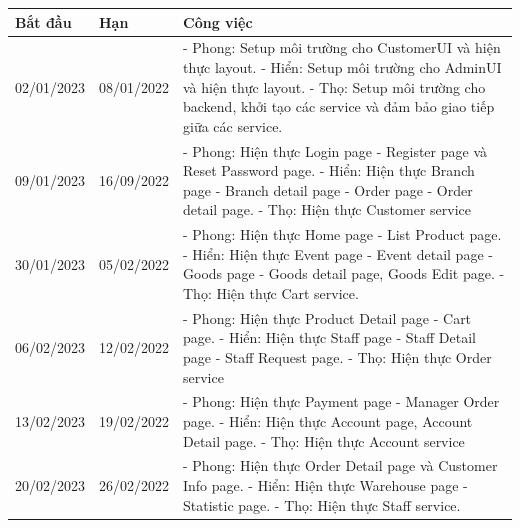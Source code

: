{\begin{longtable}{| p{2cm} | p{2cm} | p{10cm} |}
	  \hline
	  \textbf{Bắt đầu} & \textbf{Hạn} & \textbf{Công việc}                                             \\
	  \hline
	  02/01/2023       & 08/01/2022   &
	  - Phong: Setup môi trường cho CustomerUI và hiện thực layout.
	  \newline
	  - Hiển: Setup môi trường cho AdminUI và hiện thực layout.
	  \newline
	  - Thọ: Setup môi trường cho backend, khởi tạo các service và đảm bảo giao tiếp giữa các service. \\
	  \hline
	  09/01/2023       & 16/09/2022   &
	  - Phong: Hiện thực Login page - Register page và Reset Password page.
	  \newline
	  - Hiển: Hiện thực Branch page - Branch detail page - Order page - Order detail page.
	  \newline
	  - Thọ: Hiện thực Customer service                                                                \\
	  \hline
	  30/01/2023       & 05/02/2022   &
	  - Phong: Hiện thực Home page - List Product page.
	  \newline
	  - Hiển: Hiện thực Event page - Event detail page - Goods page - Goods detail page, Goods Edit page.
	  \newline
	  - Thọ: Hiện thực Cart service.                                                                   \\
	  \hline
	  06/02/2023       & 12/02/2022   &
	  - Phong: Hiện thực Product Detail page - Cart page.
	  \newline
	  - Hiển: Hiện thực Staff page - Staff Detail page - Staff Request page.
	  \newline
	  - Thọ: Hiện thực Order service                                                                   \\
	  \hline
	  13/02/2023       & 19/02/2022   &
	  - Phong: Hiện thực Payment page - Manager Order page.
	  \newline
	  - Hiển: Hiện thực Account page, Account Detail page.
	  \newline
	  - Thọ: Hiện thực Account service                                                                 \\
	  \hline
	  20/02/2023       & 26/02/2022   &
	  - Phong: Hiện thực Order Detail page và Customer Info page.
	  \newline
	  - Hiển: Hiện thực Warehouse page - Statistic page.
	  \newline
	  - Thọ: Hiện thực Staff service.                                                                  \\

\end{longtable}}
